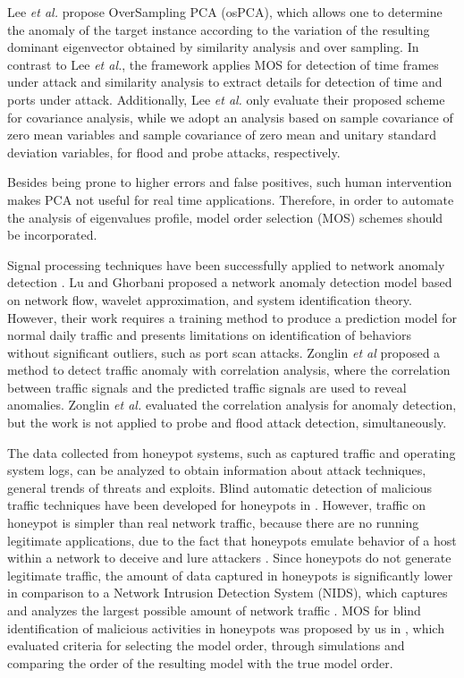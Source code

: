 Lee \emph{et al.} \cite{Lee2013} propose OverSampling PCA (osPCA), which allows one to determine the anomaly of the target instance according to the variation of the resulting dominant eigenvector obtained by similarity analysis and over sampling. In contrast to Lee \emph{et al.}, the framework applies MOS for detection of time frames under attack and similarity analysis to extract details for detection of time and ports under attack. Additionally, Lee \emph{et al.} only evaluate their proposed scheme for covariance analysis, while we adopt an analysis based on sample covariance of zero mean variables and sample covariance of zero mean and unitary standard deviation variables, for flood and probe attacks, respectively. 

Besides being prone to higher errors and false positives, such human intervention makes PCA not useful for real time applications. Therefore, in order to automate the analysis of eigenvalues profile, model order selection (MOS) schemes should be incorporated.

Signal processing techniques have been successfully applied to network anomaly detection \cite{Lu2009}. Lu and Ghorbani \cite{Lu2009} proposed a network anomaly detection model based on network flow, wavelet approximation, and system identification theory. However, their work requires a training method to produce a prediction model for normal daily traffic and presents limitations on identification of behaviors without significant outliers, such as port scan attacks. Zonglin \emph{et al} \cite{Zonglin2009} proposed a method to detect traffic anomaly with correlation analysis, where the correlation between traffic signals and the predicted traffic signals are used to reveal anomalies. Zonglin \emph{et al.} \cite{Zonglin2009} evaluated the correlation analysis for anomaly detection, but the work is not applied to probe and flood attack detection, simultaneously.

The data collected from honeypot systems, such as captured traffic and operating system logs, can be analyzed to obtain information about attack techniques, general trends of threats and exploits. Blind automatic detection of malicious traffic techniques have been developed for honeypots in \cite{david2011blind,da2012improved}. However, traffic on honeypot is simpler than real network traffic, because there are no running legitimate applications, due to the fact that honeypots emulate behavior of a host within a network to deceive and lure attackers \cite{zakaria2012review}. Since honeypots do not generate legitimate traffic, the amount of data captured in honeypots is significantly lower in comparison to a Network Intrusion Detection System (NIDS), which captures and analyzes the largest possible amount of network traffic \cite{david2011blind}. MOS for blind identification of malicious activities in honeypots was proposed by us in \cite{david2011blind}, which evaluated criteria for selecting the model order, through simulations and comparing the order of the resulting model with the true model order.

